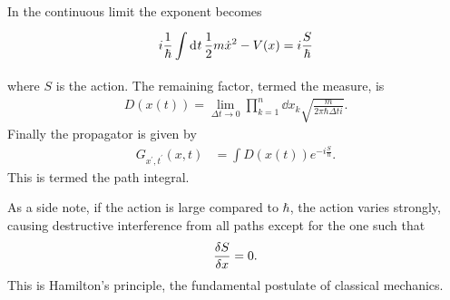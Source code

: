 In the continuous limit the exponent becomes
\begin{align*}
	i\frac{1}{\hbar}\int\limits_{}^{}\dd[]{t}\frac{1}{2}m\dot{x}^{2} - V(x) = i\frac{S}{\hbar}
\end{align*}
where $S$ is the action. The remaining factor, termed the measure, is
\begin{align*}
	D(x(t)) = \lim\limits_{\Delta t \to 0}\prod\limits_{k = 1}^{n}\dd{x_{k}}\sqrt{\frac{m}{2\pi\hbar\Delta ti}}.
\end{align*}
Finally the propagator is given by
\begin{align*}
	G_{x^{\prime}, t^{\prime}}(x, t) &= \int D(x(t))e^{-i\frac{S}{\hbar}}.
\end{align*}
This is termed the path integral.

As a side note, if the action is large compared to $\hbar$, the action varies strongly, causing destructive interference from all paths except for the one such that
\begin{align*}
	\fdv{S}{x} = 0.
\end{align*}
This is Hamilton's principle, the fundamental postulate of classical mechanics.

